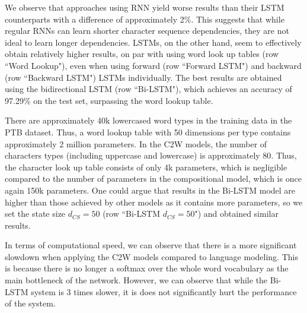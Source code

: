 \documentclass[11pt]{article}
\begin{document}
\begin{CJK*}{UTF8}{gbsn}
We observe that approaches using RNN yield worse results than their LSTM counterparts with a difference of approximately 2\%.  This suggests that while regular RNNs can learn shorter character sequence dependencies, they are not ideal to learn longer dependencies. LSTMs, on the other hand, seem to effectively obtain relatively higher results, on par with using word look up tables (row ``Word Lookup"), even when using forward (row ``Forward LSTM") and backward (row ``Backward LSTM") LSTMs individually. The best results are obtained using the bidirectional LSTM (row ``Bi-LSTM"), which achieves an accuracy of 97.29\% on the test set, surpassing the word lookup table. 

There are approximately 40k lowercased word types in the training data in the PTB dataset. Thus, a word lookup table with 50 dimensions per type contains approximately 2 million parameters. In the C2W models, the number of characters types (including uppercase and lowercase) is approximately 80. Thus, the character look up table consists of only 4k parameters, which is negligible compared to the number of parameters in the compositional model, which is once again 150k parameters. One could argue that results in the Bi-LSTM model are higher than those achieved by other models as it contains more parameters, so we set the state size $d_{CS}=50$ (row ``Bi-LSTM $d_{CS}=50$") and obtained similar results.

In terms of computational speed, we can observe that there is a more significant slowdown when applying the C2W models compared to language modeling. This is because there is no longer a softmax over the whole word vocabulary as the main bottleneck of the network. However, we can observe that while the Bi-LSTM system is 3 times slower, it is does not significantly hurt the performance of the system.

\begin{table}
\begin{center}
\end{center}
\end{table}
\end{CJK*}
\end{document}
